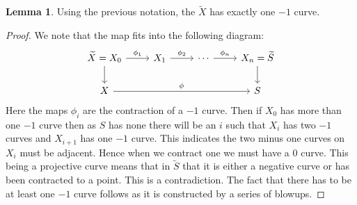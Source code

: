 \documentclass[11pt]{amsart}
\theoremstyle{definition}
\theoremstyle{definition}
\theoremstyle{definition}
\theoremstyle{definition}
\theoremstyle{definition}
\newtheorem{lem}[thm]{Lemma}
\theoremstyle{definition}
\theoremstyle{definition}
\theoremstyle{definition}
\newcommand{\wt}[1]{\widetilde{#1}}
\begin{document}
\begin{lem}\label{onecurve}
Using the previous notation, the $\wt{X}$ has exactly one $-1$ curve.
\end{lem}
\begin{proof}
We note that the map fits into the following diagram:
\[
\begin{tikzcd}
\wt{X}  = X_0 \arrow[r, "\phi_1"] \arrow[d] & X_1 \arrow[r, "\phi_2"] & \cdots \arrow[r, "\phi_n"] & X_n = \wt{S} \arrow[d] \\
X \arrow[rrr, "\phi"]                      &               &                            & S                     
\end{tikzcd}
\]
Here the maps $\phi_i$ are the contraction of a $-1$ curve. Then if $X_0$ has more than one $-1$ curve then as $S$ has none there will be an $i$ such that $X_i$ has two $-1$ curves and $X_{i+1}$ has one $-1$ curve. This indicates the two minus one curves on $X_i$ must be adjacent. Hence when we contract one we must have a $0$ curve. This being a projective curve means that in $\wt{S}$ that it is either a negative curve or has been contracted to a point. This is a contradiction. The fact that there has to be at least one $-1$ curve follows as it is constructed by a series of blowups.
\end{proof}
 
\end{document}
